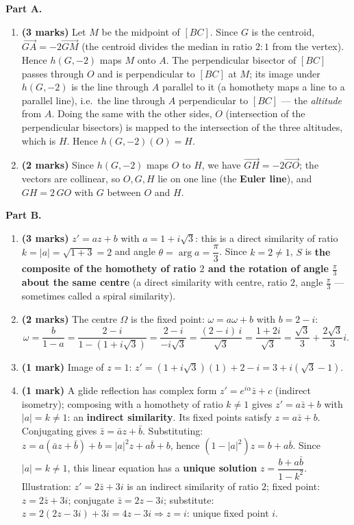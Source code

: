 \documentclass[11pt]{article}
\begin{document}
\begin{corrige}
\textbf{Part A.}
\begin{enumerate}
\item \textbf{(3 marks)} Let $M$ be the midpoint of $[BC]$. Since $G$ is the centroid, $\overrightarrow{GA} = -2\overrightarrow{GM}$ (the centroid divides the median in ratio $2:1$ from the vertex). Hence $h(G,-2)$ maps $M$ onto $A$. The perpendicular bisector of $[BC]$ passes through $O$ and is perpendicular to $[BC]$ at $M$; its image under $h(G,-2)$ is the line through $A$ parallel to it (a homothety maps a line to a parallel line), i.e.\ the line through $A$ perpendicular to $[BC]$ — the \emph{altitude} from $A$. Doing the same with the other sides, $O$ (intersection of the perpendicular bisectors) is mapped to the intersection of the three altitudes, which is $H$. Hence $h(G,-2)(O) = H$.
\item \textbf{(2 marks)} Since $h(G,-2)$ maps $O$ to $H$, we have $\overrightarrow{GH} = -2\overrightarrow{GO}$; the vectors are collinear, so $O, G, H$ lie on one line (the \textbf{Euler line}), and $GH = 2\,GO$ with $G$ between $O$ and $H$.
\end{enumerate}
\textbf{Part B.}
\begin{enumerate}
\item \textbf{(3 marks)} $z' = az + b$ with $a = 1 + i\sqrt3$: this is a direct similarity of ratio $k = |a| = \sqrt{1+3} = 2$ and angle $\theta = \arg a = \dfrac{\pi}{3}$. Since $k = 2 \neq 1$, $S$ is \textbf{the composite of the homothety of ratio $2$ and the rotation of angle $\frac{\pi}{3}$ about the same centre} (a direct similarity with centre, ratio $2$, angle $\frac{\pi}{3}$ — sometimes called a spiral similarity).
\item \textbf{(2 marks)} The centre $\Omega$ is the fixed point: $\omega = a\omega + b$ with $b = 2 - i$:
\[ \omega = \frac{b}{1-a} = \frac{2 - i}{1 - (1+i\sqrt3)} = \frac{2-i}{-i\sqrt3} = \frac{(2-i)\,i}{ \sqrt3} = \frac{1 + 2i}{\sqrt3} = \frac{\sqrt3}{3} + \frac{2\sqrt3}{3}i. \]
\item \textbf{(1 mark)} Image of $z = 1$: $z' = (1+i\sqrt3)(1) + 2 - i = 3 + i(\sqrt3 - 1)$.
\item \textbf{(1 mark)} A glide reflection has complex form $z' = e^{i\alpha}\bar z + c$ (indirect isometry); composing with a homothety of ratio $k \neq 1$ gives $z' = a\bar z + b$ with $|a| = k \neq 1$: an \textbf{indirect similarity}. Its fixed points satisfy $z = a\bar z + b$. Conjugating gives $\bar z = \bar a z + \bar b$. Substituting: $z = a(\bar a z + \bar b) + b = |a|^2 z + a\bar b + b$, hence $(1-|a|^2)z = b + a\bar b$. Since $|a| = k \neq 1$, this linear equation has a \textbf{unique solution} $z = \dfrac{b + a\bar b}{1-k^2}$. Illustration: $z' = 2\bar z + 3i$ is an indirect similarity of ratio $2$; fixed point: $z = 2\bar z + 3i$; conjugate $\bar z = 2z - 3i$; substitute: $z = 2(2z-3i)+3i = 4z - 3i \Rightarrow z = i$: unique fixed point $i$.

\end{enumerate}
\end{corrige}
\end{document}
